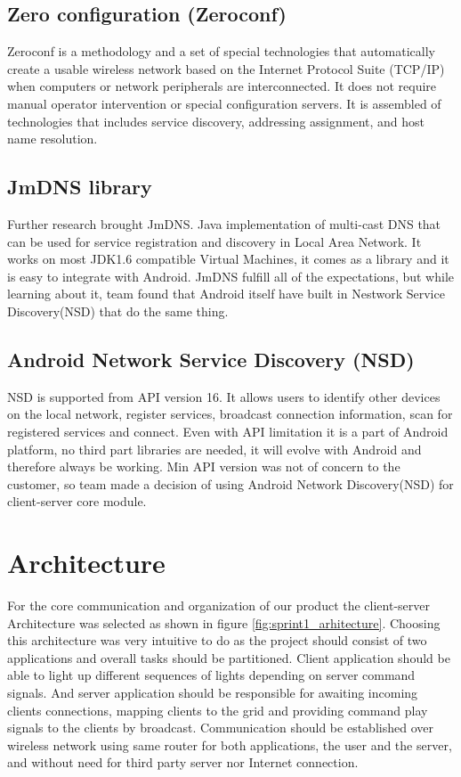 \subsection {Zero configuration (Zeroconf)}
Zeroconf is a methodology and a set of special technologies that automatically create a usable wireless network based on the Internet Protocol Suite (TCP/IP) when computers or network peripherals are interconnected. 
It does not require manual operator intervention or special configuration servers.
It is assembled of technologies that includes service discovery, addressing assignment, and host name resolution.


\subsection{JmDNS library}
Further research brought JmDNS. 
Java implementation of multi-cast DNS that can be used for service registration and discovery in Local Area Network. 
It works on most JDK1.6 compatible Virtual Machines, it comes as a library and it is easy to integrate with Android. 
JmDNS fulfill all of the expectations, but while learning about it, team found that Android itself have built in Nestwork Service Discovery(NSD) that do the same thing.

\subsection{Android Network Service Discovery (NSD)}
NSD is supported from API version 16. 
It allows users to identify other devices on the local network, register services, broadcast connection information, scan for registered services and connect.
Even with API limitation it is a part of Android platform, no third part libraries are needed, it will evolve with Android and therefore always be working.
Min API version was not of concern to the customer, so team made a decision of using Android Network Discovery(NSD) for client-server core module.

\section{Architecture}
For the core communication and organization of our product the client-server Architecture was selected as shown in figure \ref{fig:sprint1_arhitecture}.
Choosing this architecture was very intuitive to do as the project should consist of two applications and overall tasks should be partitioned. 
Client application should be able to light up different sequences of lights depending on server command signals.
And server application should be responsible for awaiting incoming clients connections, mapping clients to the grid and providing command play signals to the clients by broadcast.
Communication should be established over wireless network using same router for both applications, the user and the server, and without need for third party server nor Internet connection.

